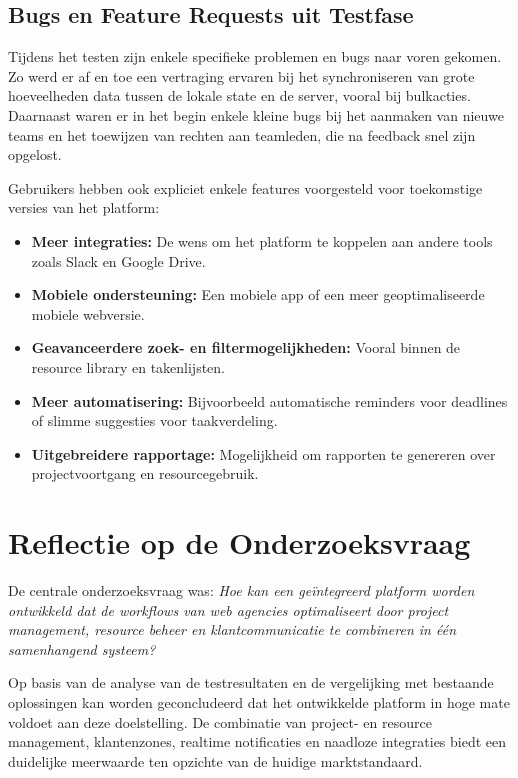 \subsection{Bugs en Feature Requests uit Testfase}
Tijdens het testen zijn enkele specifieke problemen en bugs naar voren gekomen. Zo werd er af en toe een vertraging ervaren bij het synchroniseren van grote hoeveelheden data tussen de lokale state en de server, vooral bij bulkacties. Daarnaast waren er in het begin enkele kleine bugs bij het aanmaken van nieuwe teams en het toewijzen van rechten aan teamleden, die na feedback snel zijn opgelost. 

Gebruikers hebben ook expliciet enkele features voorgesteld voor toekomstige versies van het platform:
\begin{itemize}
    \item \textbf{Meer integraties:} De wens om het platform te koppelen aan andere tools zoals Slack en Google Drive.
    \item \textbf{Mobiele ondersteuning:} Een mobiele app of een meer geoptimaliseerde mobiele webversie.
    \item \textbf{Geavanceerdere zoek- en filtermogelijkheden:} Vooral binnen de resource library en takenlijsten.
    \item \textbf{Meer automatisering:} Bijvoorbeeld automatische reminders voor deadlines of slimme suggesties voor taakverdeling.
    \item \textbf{Uitgebreidere rapportage:} Mogelijkheid om rapporten te genereren over projectvoortgang en resourcegebruik.
\end{itemize}

\section{Reflectie op de Onderzoeksvraag}
\label{sec:reflectie-onderzoeksvraag}

De centrale onderzoeksvraag was: \emph{Hoe kan een geïntegreerd platform worden ontwikkeld dat de workflows van web agencies optimaliseert door project management, resource beheer en klantcommunicatie te combineren in één samenhangend systeem?}

Op basis van de analyse van de testresultaten en de vergelijking met bestaande oplossingen kan worden geconcludeerd dat het ontwikkelde platform in hoge mate voldoet aan deze doelstelling. De combinatie van project- en resource management, klantenzones, realtime notificaties en naadloze integraties biedt een duidelijke meerwaarde ten opzichte van de huidige marktstandaard.

